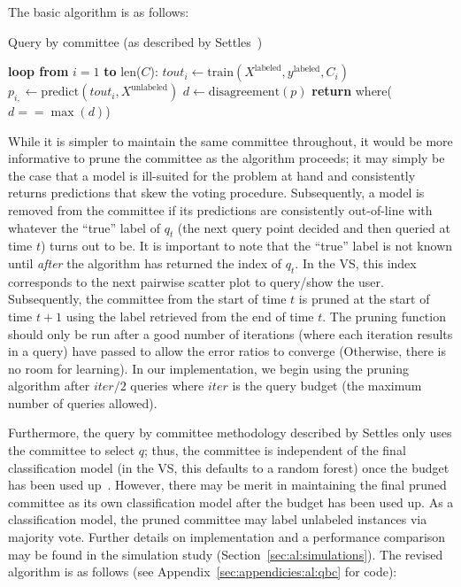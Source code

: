 The basic algorithm is as follows:

\tablespacing
\begin{algorithm}[H]
	\caption{Query by committee (as described by 
	Settles~\cite{settles2010})}\label{alg:al:methods:qbc1}
	\begin{algorithmic}[1]
		\State \textbf{loop from} $i=1$ \textbf{to} len($C$):
		\State \indent $\textit{tout}_{i} \gets 
		\text{train}(X^{\text{labeled}},y^{\text{labeled}},C_i)$
		\State \indent $p_{i,} \gets 
		\text{predict}(\textit{tout}_i,X^{\text{unlabeled}})$
		\State $d \gets \text{disagreement}(p)$
		\State \textbf{return} where($d==\max{(d)}$)
		\EndProcedure
	\end{algorithmic}
\end{algorithm}
\bodyspacing

\noindent While it is simpler to maintain the same committee 
throughout, it would be more informative to prune the committee as the 
algorithm proceeds; it may simply be the case that a model is ill-suited for 
the problem at hand and consistently returns predictions that skew the voting 
procedure. Subsequently, a model is removed from the committee if its 
predictions are consistently out-of-line with whatever the ``true'' label of 
$q_t$ (the next query point decided and then queried at time $t$) turns out to 
be. It is important to note that the ``true'' label is not known until 
\textit{after} the algorithm has returned the index of $q_t$. In the VS, this 
index corresponds to the next pairwise scatter plot to query/show the 
user. Subsequently, the committee from the start of time $t$ is pruned at the 
start of time $t+1$ using the label retrieved from the end of time $t$. The 
pruning function should only 
be run after a good number of iterations (where each iteration results in a 
query) have passed to allow the error ratios to converge (Otherwise, there is 
no room for learning). In our implementation, we begin using the pruning 
algorithm after $iter/2$ queries where $iter$ is the query budget (the maximum 
number of queries allowed).

Furthermore, the query by committee methodology described by Settles only uses 
the committee to select $q$; thus, the committee is independent of the final 
classification model (in the VS, this defaults to a random forest) once the 
budget has 
been used up~\cite{settles2010}. However, there may be merit in maintaining the 
final pruned committee as its own classification model after the budget has 
been used up. As a classification model, the pruned committee may label 
unlabeled instances via majority vote. Further details on implementation and a 
performance comparison may be found in the simulation study 
(Section~\ref{sec:al:simulations}). The revised algorithm is as follows (see 
Appendix~\ref{sec:appendicies:al:qbc} for code):

